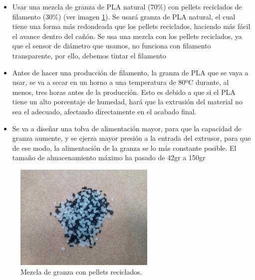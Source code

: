\begin{itemize}
    \item{Usar una mezcla de granza de PLA natural (70\%) con pellets reciclados de filamento (30\%) (ver imagen \ref{fig:2007105-mezc}). Se usará granza de PLA natural, el cual tiene una forma más redondeada que los pellets reciclados, haciendo más fácil el avance dentro del cañón. Se usa una mezcla con los pellets reciclados, ya que el sensor de diámetro que usamos, no funciona con filamento transparente, por ello, debemos tintar el filamento}
    \item{Antes de hacer una producción de filamento, la granza de PLA que se vaya a usar, se va a secar en un horno a una temperatura de 80ºC durante, al menos, tres horas antes de la producción. Esto es debido a que si el PLA tiene un alto porcentaje de humedad, hará que la extrusión del material no sea el adecuado, afectando directamente en el acabado final.}
    \item{Se va a diseñar una tolva de alimentación mayor, para que la capacidad de granza aumente, y se ejerza mayor presión a la entrada del extrusor, para que de ese modo, la alimentación de la granza se lo más constante posible. El tamaño de almacenamiento máximo ha pasado de 42gr a 150gr}
\end{itemize}


\begin{figure}[H]
    \centering
    \includegraphics[width=0.6\textwidth]{images/producciones/20072015/IMG_20150903_155859.jpg}
    \caption{Mezcla de granza con pellets reciclados.}
    \label{fig:2007105-mezc}
\end{figure}

